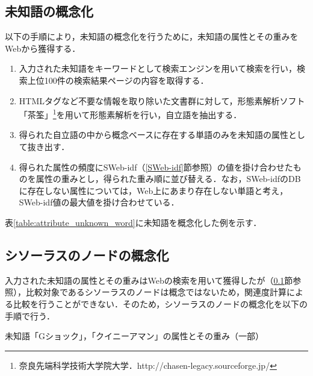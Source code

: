 \documentclass[japanese]{jnlp_1.4}
\begin{document}
\subsection{未知語の概念化}\label{acquiring_attribute_of_unknown_word}

以下の手順により，未知語の概念化を行うために，未知語の属性とその重みをWebから獲得する．

\begin{enumerate}
\item 
入力された未知語をキーワードとして検索エンジンを用いて検索を行い，検索上位100件の検索結果ページの内容を取得する．
\item 
HTMLタグなど不要な情報を取り除いた文書群に対して，形態素解析ソフト「茶筌」\footnote{奈良先端科学技術大学院大学．http://chasen-legacy.sourceforge.jp/}を用いて形態素解析を行い，自立語を抽出する．

\item 
得られた自立語の中から概念ベースに存在する単語のみを未知語の属性として抜き出す．

\item 
得られた属性の頻度にSWeb-idf（\ref{SWeb-idf}節参照）の値を掛け合わせたものを属性の重みとし，得られた重み順に並び替える．なお，SWeb-idfのDBに存在しない属性については，Web上にあまり存在しない単語と考え，SWeb-idf値の最大値を掛け合わせている．
\end{enumerate}

表\ref{table:attribute_unknown_word}に未知語を概念化した例を示す．


\subsection{シソーラスのノードの概念化}\label{acquiring_attribute_of_node}

入力された未知語の属性とその重みはWebの検索を用いて獲得したが（\ref{acquiring_attribute_of_unknown_word}節参照），比較対象であるシソーラスのノードは概念ではないため，関連度計算による比較を行うことができない．そのため，シソーラスのノードの概念化を以下の手順で行う\cite{ito:04}．

\begin{table}[t]
\caption{未知語「Gショック」，「クイニーアマン」の属性とその重み（一部）}

\label{table:attribute_unknown_word}
\end{table}
\end{document}
